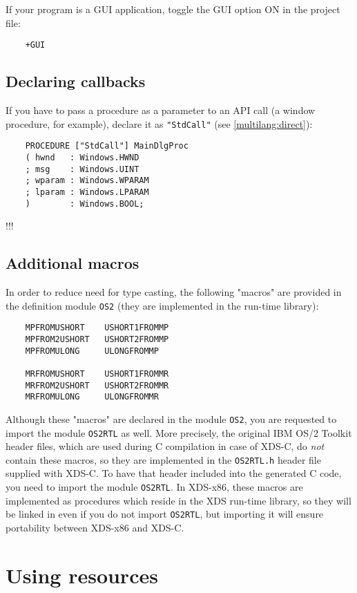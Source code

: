 If your program is a GUI application, toggle
the GUI option ON in the project file:

\verb'    +GUI'

\subsection{Declaring callbacks}

If you have to pass a procedure as a parameter to an API call (a window
procedure, for example), declare it as \verb'"StdCall"'
(see \ref{multilang:direct}):

\begin{verbatim}
    PROCEDURE ["StdCall"] MainDlgProc
    ( hwnd   : Windows.HWND
    ; msg    : Windows.UINT
    ; wparam : Windows.WPARAM
    ; lparam : Windows.LPARAM
    )        : Windows.BOOL;
\end{verbatim}

\ifcomment !!!
\subsection{Additional macros}

In order to reduce need for type casting, the following "macros" are
provided in the definition module \verb'OS2'
(they are implemented in the run-time library):

\begin{verbatim}
    MPFROMUSHORT    USHORT1FROMMP
    MPFROM2USHORT   USHORT2FROMMP
    MPFROMULONG     ULONGFROMMP

    MRFROMUSHORT    USHORT1FROMMR
    MRFROM2USHORT   USHORT2FROMMR
    MRFROMULONG     ULONGFROMMR
\end{verbatim}

Although these "macros" are declared in the module \verb'OS2', you are
requested to import the module \verb'OS2RTL' as well. More precisely,
the original IBM OS/2 Toolkit header files, which are used during C compilation
in case of XDS-C, do {\em not} contain these macros, so they are implemented in
the \verb'OS2RTL.h' header file supplied with XDS-C.
To have that header included into the generated C code, you need to
import the module \verb'OS2RTL'.
In XDS-x86, these macros are implemented as procedures which reside
in the XDS run-time library, so they will be linked in even if you do not
import \verb'OS2RTL', but importing it will ensure portability between
XDS-x86 and XDS-C.

\fi

\section{Using resources}

